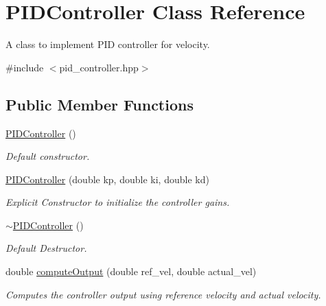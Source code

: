 \hypertarget{classPIDController}{}\section{P\+I\+D\+Controller Class Reference}
\label{classPIDController}


A class to implement P\+ID controller for velocity.  




{\ttfamily \#include $<$pid\+\_\+controller.\+hpp$>$}

\subsection*{Public Member Functions}
\begin{DoxyCompactItemize}
\item 
\mbox{\label{classPIDController_a67cc314aa5b3b4e9c47ac414b3a4c008}} 
\hyperlink{classPIDController_a67cc314aa5b3b4e9c47ac414b3a4c008}{P\+I\+D\+Controller} ()
\begin{DoxyCompactList}\small\item\em Default constructor. \end{DoxyCompactList}\item 
\hyperlink{classPIDController_aa71d105ec0ecd3c96ef1f5d3b39cce10}{P\+I\+D\+Controller} (double kp, double ki, double kd)
\begin{DoxyCompactList}\small\item\em Explicit Constructor to initialize the controller gains. \end{DoxyCompactList}\item 
\mbox{\label{classPIDController_a690e7ad4796e5c5143aa4b90f2f6677b}} 
\hyperlink{classPIDController_a690e7ad4796e5c5143aa4b90f2f6677b}{$\sim$\+P\+I\+D\+Controller} ()
\begin{DoxyCompactList}\small\item\em Default Destructor. \end{DoxyCompactList}\item 
double \hyperlink{classPIDController_af80b06cf94c441f89b0ea1b7fe19fc2a}{compute\+Output} (double ref\+\_\+vel, double actual\+\_\+vel)
\begin{DoxyCompactList}\small\item\em Computes the controller output using reference velocity and actual velocity. \end{DoxyCompactList}\item 

\end{DoxyCompactItemize}
